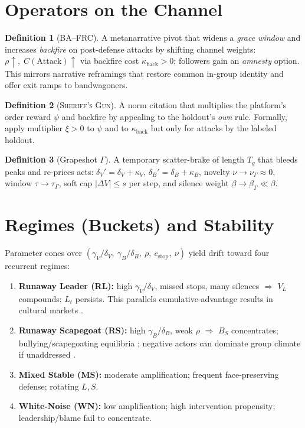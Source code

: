 \documentclass[11pt]{article}
\theoremstyle{definition}
\newtheorem{definition}{Definition}
\newcommand{\BAFRC}{\textsc{BA--FRC}} %
\newcommand{\Sheriff}{\textsc{Sheriff's Gun}}
\begin{document}
\section{Operators on the Channel}\label{sec:operators}
\begin{definition}[\BAFRC{}]
A metanarrative pivot that widens a \emph{grace window} and increases \emph{backfire} on post\hyp defense attacks by shifting channel weights:
$\rho \uparrow,\; C(\mathrm{Attack}) \uparrow$ via backfire cost $\kappa_{\text{back}}\!>\!0$; followers gain an \emph{amnesty} option. This mirrors narrative reframings that restore common in\hyp group identity and offer exit ramps to bandwagoners.
\end{definition}
\begin{definition}[\Sheriff{}]
A norm citation that multiplies the platform’s order reward $\psi$ and backfire by appealing to the holdout’s \emph{own} rule. Formally, apply multiplier $\xi>0$ to $\psi$ and to $\kappa_{\text{back}}$ but only for attacks by the labeled holdout.
\end{definition}
\begin{definition}[Grapeshot $\Gamma$]
A temporary scatter\hyp brake of length $T_g$ that bleeds peaks and re\hyp prices acts: $\delta_V'=\delta_V+\kappa_V$, $\delta_B'=\delta_B+\kappa_B$, novelty $\nu\!\to\!\nu_\Gamma\!\approx\!0$, window $\tau\!\to\!\tau_\Gamma$, soft cap $|\Delta V|\le s$ per step, and silence weight $\beta\to\beta_\Gamma\ll\beta$.
\end{definition}

\section{Regimes (Buckets) and Stability}
Parameter cones over $(\gamma_V/\delta_V,\ \gamma_B/\delta_B,\ \rho,\ c_{\text{stop}},\ \nu)$ yield drift toward four recurrent regimes:
\begin{enumerate}[label=(\roman*),leftmargin=2em]
\item \textbf{Runaway Leader (RL):} high $\gamma_V/\delta_V$, missed stops, many silences $\Rightarrow$ $V_{L}$ compounds; $L_t$ persists. This parallels cumulative\hyp advantage results in cultural markets \citep{salganik2006}.
\item \textbf{Runaway Scapegoat (RS):} high $\gamma_B/\delta_B$, weak $\rho$ $\Rightarrow$ $B_S$ concentrates; bullying/scapegoating equilibria \citep{gemmill1989,girard1986}; negative actors can dominate group climate if unaddressed \citep{felps2006}.
\item \textbf{Mixed Stable (MS):} moderate amplification; frequent face\hyp preserving defense; rotating $L,S$.
\item \textbf{White\hyp Noise (WN):} low amplification; high intervention propensity; leadership/blame fail to concentrate.
\end{enumerate}
\end{document}
